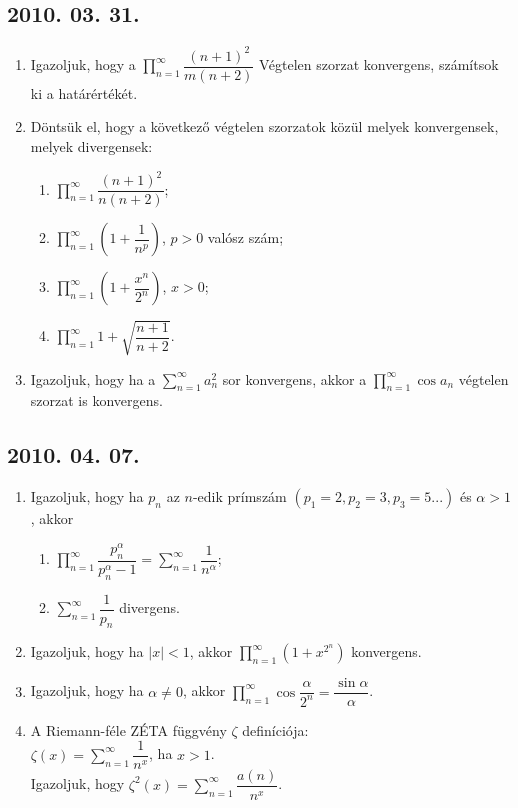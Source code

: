 \documentclass{article}
\newenvironment{abc}{\begin{enumerate}[label=\textit{\alph*})]}{\end{enumerate}}
\begin{document}
\subsection*{2010. 03. 31.}
\begin{enumerate}
\item Igazoljuk, hogy a $\displaystyle\prod_{n=1}^{\infty} \dfrac{(n+1)^2}{m(n+2)}$ Végtelen szorzat konvergens, számítsok ki a határértékét.
\item Döntsük el, hogy a következő végtelen szorzatok közül melyek konvergensek, melyek divergensek:
	\begin{abc}
	\item $\displaystyle\prod_{n=1}^{\infty} \dfrac{(n+1)^2}{n(n+2)}$;
    \item $\displaystyle\prod_{n=1}^{\infty} \left(1+\dfrac{1}{n^p}\right)$, $p>0$ valósz szám;
    \item $\displaystyle\prod_{n=1}^{\infty} \left(1+\dfrac{x^n}{2^n}\right)$, $x>0$;
    \item $\displaystyle\prod_{n=1}^{\infty} 1+\sqrt{\dfrac{n+1}{n+2}}$.
	\end{abc}
\item Igazoljuk, hogy ha a $\displaystyle\sum_{n=1}^{\infty} a_n^2$ sor konvergens, akkor a $\displaystyle\prod_{n=1}^{\infty}\cos a_n$ végtelen szorzat is konvergens.
\end{enumerate}

\subsection*{2010. 04. 07.}
\begin{enumerate}
\item Igazoljuk, hogy ha $p_n$ az $n$-edik prímszám $(p_1=2, p_2=3, p_3=5 ...)$ és $\alpha>1$, akkor
	\begin{abc}
	\item $\displaystyle\prod_{n=1}^{\infty} \dfrac{p_n^{\alpha}}{p_n^{\alpha}-1}=\displaystyle\sum_{n=1}^{\infty}\dfrac{1}{n^{\alpha}}$;
    \item $\displaystyle\sum_{n=1}^{\infty}\dfrac{1}{p_n}$ divergens.
	\end{abc}
\item Igazoljuk, hogy ha $|x|<1$, akkor $\displaystyle\prod_{n=1}^{\infty} (1+x^{2^n})$ konvergens.
\item Igazoljuk, hogy ha $\alpha \not = 0$, akkor $\displaystyle\prod_{n=1}^{\infty}\cos\dfrac{\alpha}{2^n}=\dfrac{\sin \alpha}{\alpha}$.
\item A Riemann-féle ZÉTA függvény $\zeta$ definíciója: \\
$\zeta(x)=\displaystyle\sum_{n=1}^{\infty}\dfrac{1}{n^x}$, ha $x>1$.\\
Igazoljuk, hogy $\zeta^2(x)=\displaystyle\sum_{n=1}^{\infty}\dfrac{a(n)}{n^x}$.
\end{enumerate}
\end{document}
